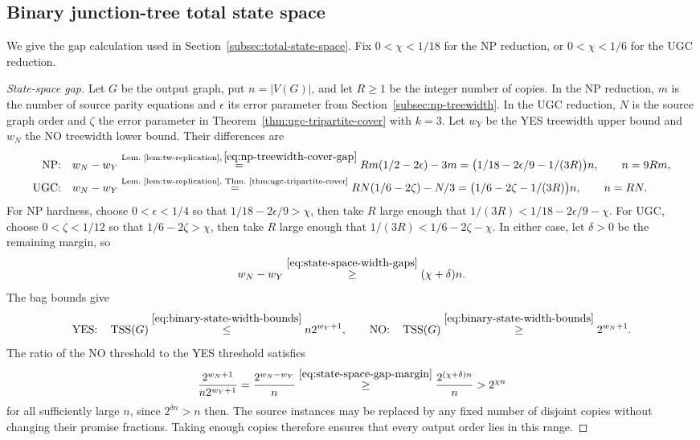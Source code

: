 \subsection{Binary junction-tree total state space}
\label{app:state-space-gap}

We give the gap calculation used in
Section~\ref{subsec:total-state-space}. Fix $0<\chi<1/18$ for the
NP reduction, or $0<\chi<1/6$ for the UGC reduction.

\begin{proof}[State-space gap]
Let $G$ be the output graph, put $n=|V(G)|$, and let $R\ge1$ be the
integer number of copies. In the NP reduction, $m$ is the number of
source parity equations and $\epsilon$ its error parameter from
Section~\ref{subsec:np-treewidth}. In the UGC reduction, $N$ is the
source graph order and $\zeta$ the error parameter in
Theorem~\ref{thm:ugc-tripartite-cover} with $k=3$.
Let $w_Y$ be the YES treewidth upper bound and $w_N$ the NO treewidth
lower bound. Their differences are
\begin{equation}\label{eq:state-space-width-gaps}
\begin{aligned}
 \textup{NP:}\quad w_N-w_Y
 &\overset{\text{Lem.~\ref{lem:tw-replication}},\,\eqref{eq:np-treewidth-cover-gap}}{=}
 Rm(1/2-2\epsilon)-3m
  =\bigl(1/18-2\epsilon/9-1/(3R)\bigr)n,
   \qquad n=9Rm,\\
 \textup{UGC:}\quad w_N-w_Y
 &\overset{\text{Lem.~\ref{lem:tw-replication}, Thm.~\ref{thm:ugc-tripartite-cover}}}{=}
 RN(1/6-2\zeta)-N/3
  =\bigl(1/6-2\zeta-1/(3R)\bigr)n,
   \qquad n=RN.\end{aligned}
\end{equation}
For NP hardness, choose $0<\epsilon<1/4$ so that
$1/18-2\epsilon/9>\chi$, then take $R$ large enough that
$1/(3R)<1/18-2\epsilon/9-\chi$. For UGC, choose
$0<\zeta<1/12$ so that $1/6-2\zeta>\chi$, then take $R$ large enough that
$1/(3R)<1/6-2\zeta-\chi$. In either case, let $\delta>0$ be the
remaining margin, so
\begin{equation}\label{eq:state-space-gap-margin}
 w_N-w_Y\overset{\eqref{eq:state-space-width-gaps}}{\geq}(\chi+\delta)n.
\end{equation}
The bag bounds give
\[
 \textup{YES:}\quad\operatorname{TSS}(G)
       \overset{\eqref{eq:binary-state-width-bounds}}{\leq}n2^{w_Y+1},\qquad
 \textup{NO:}\quad\operatorname{TSS}(G)
       \overset{\eqref{eq:binary-state-width-bounds}}{\geq}2^{w_N+1}.
\]
The ratio of the NO threshold to the YES threshold satisfies
\[
 \frac{2^{w_N+1}}{n2^{w_Y+1}}
 =\frac{2^{w_N-w_Y}}n
 \overset{\eqref{eq:state-space-gap-margin}}{\geq}
       \frac{2^{(\chi+\delta)n}}n>2^{\chi n}
\]
for all sufficiently large $n$, since $2^{\delta n}>n$ then.
The source instances may be replaced by any fixed number of disjoint
copies without changing their promise fractions. Taking enough copies
therefore ensures that every output order lies in this range.
\end{proof}
